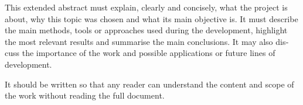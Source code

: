 
\begin{otherlanguage}{english}


This extended abstract must explain, clearly and concisely, what the project is about, why this topic was chosen and what its main objective is. It must describe the main methods, tools or approaches used during the development, highlight the most relevant results and summarise the main conclusions. It may also discuss the importance of the work and possible applications or future lines of development.

It should be written so that any reader can understand the content and scope of the work without reading the full document.
\end{otherlanguage}
